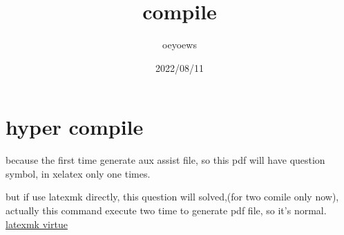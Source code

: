 \documentclass[UTF8]{article}
\title{compile}
\author{oeyoews}
\date{2022/08/11}
\begin{document}
\maketitle

\section{hyper compile}%
\label{sec:hyper compile}

because the first time generate aux assist file, so this pdf will have question
symbol, in xelatex only one times.

but if use latexmk directly, this question will solved,(for two comile only
now), actually this command execute two time to generate pdf file, so it's
normal. \href{https://qa.1r1g.cn/tex/ask/17397131/}{latexmk virtue}
\end{document}
